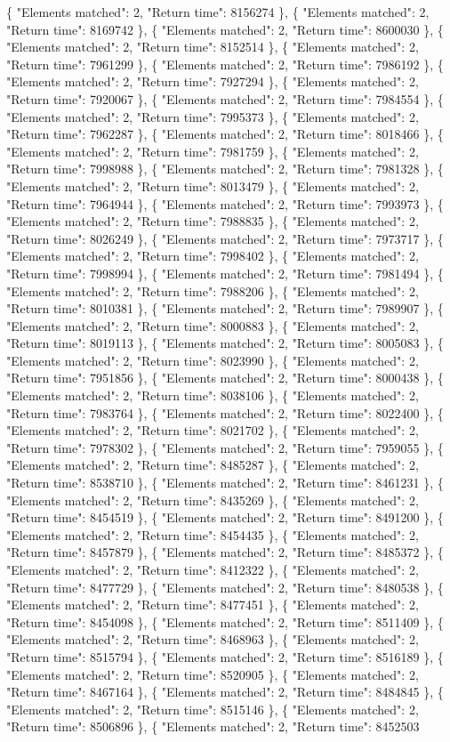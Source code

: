  \{ "Elements matched": 2, "Return time": 8156274 \}, \{ "Elements matched": 2, "Return time": 8169742 \}, \{ "Elements matched": 2, "Return time": 8600030 \}, \{ "Elements matched": 2, "Return time": 8152514 \}, \{ "Elements matched": 2, "Return time": 7961299 \}, \{ "Elements matched": 2, "Return time": 7986192 \}, \{ "Elements matched": 2, "Return time": 7927294 \}, \{ "Elements matched": 2, "Return time": 7920067 \}, \{ "Elements matched": 2, "Return time": 7984554 \}, \{ "Elements matched": 2, "Return time": 7995373 \}, \{ "Elements matched": 2, "Return time": 7962287 \}, \{ "Elements matched": 2, "Return time": 8018466 \}, \{ "Elements matched": 2, "Return time": 7981759 \}, \{ "Elements matched": 2, "Return time": 7998988 \}, \{ "Elements matched": 2, "Return time": 7981328 \}, \{ "Elements matched": 2, "Return time": 8013479 \}, \{ "Elements matched": 2, "Return time": 7964944 \}, \{ "Elements matched": 2, "Return time": 7993973 \}, \{ "Elements matched": 2, "Return time": 7988835 \}, \{ "Elements matched": 2, "Return time": 8026249 \}, \{ "Elements matched": 2, "Return time": 7973717 \}, \{ "Elements matched": 2, "Return time": 7998402 \}, \{ "Elements matched": 2, "Return time": 7998994 \}, \{ "Elements matched": 2, "Return time": 7981494 \}, \{ "Elements matched": 2, "Return time": 7988206 \}, \{ "Elements matched": 2, "Return time": 8010381 \}, \{ "Elements matched": 2, "Return time": 7989907 \}, \{ "Elements matched": 2, "Return time": 8000883 \}, \{ "Elements matched": 2, "Return time": 8019113 \}, \{ "Elements matched": 2, "Return time": 8005083 \}, \{ "Elements matched": 2, "Return time": 8023990 \}, \{ "Elements matched": 2, "Return time": 7951856 \}, \{ "Elements matched": 2, "Return time": 8000438 \}, \{ "Elements matched": 2, "Return time": 8038106 \}, \{ "Elements matched": 2, "Return time": 7983764 \}, \{ "Elements matched": 2, "Return time": 8022400 \}, \{ "Elements matched": 2, "Return time": 8021702 \}, \{ "Elements matched": 2, "Return time": 7978302 \}, \{ "Elements matched": 2, "Return time": 7959055 \}, \{ "Elements matched": 2, "Return time": 8485287 \}, \{ "Elements matched": 2, "Return time": 8538710 \}, \{ "Elements matched": 2, "Return time": 8461231 \}, \{ "Elements matched": 2, "Return time": 8435269 \}, \{ "Elements matched": 2, "Return time": 8454519 \}, \{ "Elements matched": 2, "Return time": 8491200 \}, \{ "Elements matched": 2, "Return time": 8454435 \}, \{ "Elements matched": 2, "Return time": 8457879 \}, \{ "Elements matched": 2, "Return time": 8485372 \}, \{ "Elements matched": 2, "Return time": 8412322 \}, \{ "Elements matched": 2, "Return time": 8477729 \}, \{ "Elements matched": 2, "Return time": 8480538 \}, \{ "Elements matched": 2, "Return time": 8477451 \}, \{ "Elements matched": 2, "Return time": 8454098 \}, \{ "Elements matched": 2, "Return time": 8511409 \}, \{ "Elements matched": 2, "Return time": 8468963 \}, \{ "Elements matched": 2, "Return time": 8515794 \}, \{ "Elements matched": 2, "Return time": 8516189 \}, \{ "Elements matched": 2, "Return time": 8520905 \}, \{ "Elements matched": 2, "Return time": 8467164 \}, \{ "Elements matched": 2, "Return time": 8484845 \}, \{ "Elements matched": 2, "Return time": 8515146 \}, \{ "Elements matched": 2, "Return time": 8506896 \}, \{ "Elements matched": 2, "Return time": 8452503 